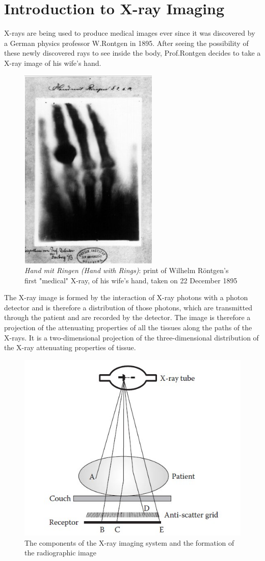 \documentclass[12pt]{article}
\begin{document}

\tableofcontents
\pagebreak


\section{Introduction to X-ray Imaging}
X-rays are being used to produce medical images ever since it was discovered by a German physics professor W.Rontgen in 1895. After seeing the possibility of these newly discovered rays to see inside the body, Prof.Rontgen decides to take a X-ray image of his wife's hand. 

\begin{figure}[h!]
  \centering
  \includegraphics[width=0.22\linewidth]{1stXray.jpg}
  \caption{\small{\textit{Hand mit Ringen (Hand with Rings)}: print of Wilhelm Röntgen's first "medical" X-ray, of his wife's hand, taken on 22 December 1895}}
  \label{fig:First X-ray Image}
\end{figure}

The X-ray image is formed by the interaction of X-ray photons with a photon
detector and is therefore a distribution of those photons, which are transmitted through
the patient and are recorded by the detector. The image is therefore a projection of the attenuating properties of all the tissues along the paths of the X-rays. It is a two-dimensional projection of the three-dimensional distribution of the X-ray attenuating properties of tissue.
\begin{figure}[h!]
  \centering
  \includegraphics[width=0.45\linewidth]{xray2.jpg}
  \caption{\small{The components of the X-ray imaging system and the formation of the radiographic image}}
  \label{fig:The components of the X-ray imaging system and the formation of the radiographic image}
\end{figure}
\end{document}
